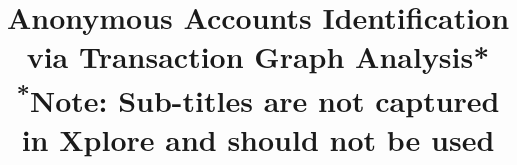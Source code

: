 \documentclass[conference]{IEEEtran}
\begin{document}
\title{Anonymous Accounts Identification via Transaction Graph Analysis*\\
{\footnotesize \textsuperscript{*}Note: Sub-titles are not captured in Xplore and
should not be used}
}


\maketitle
\end{document}
